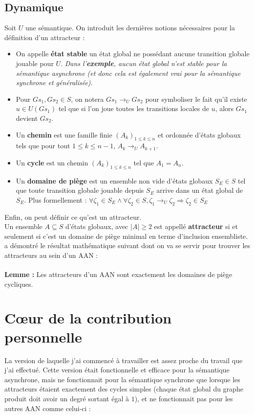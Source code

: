 \documentclass[12pt,a4paper]{article}
\begin{document}
\subsection{Dynamique}
Soit $U$ une sémantique. On introduit les dernières notions nécessaires pour la définition d'un attracteur :
\begin{itemize}
	\item On appelle \textbf{état stable} un état global ne possédant aucune transition globale jouable pour $U$.
	\emph{Dans l'\textbf{exemple}, aucun état global n'est stable pour la sémantique asynchrone (et donc cela est également vrai pour la sémantique synchrone et généralisée).}
	\item Pour $Gs_1,Gs_2\in S$, on notera $Gs_1\rightarrow _UGs_2$ pour symboliser le fait qu'il existe $u\in U(Gs_1)$ tel que si l'on joue toutes les transitions locales de $u$, alors $Gs_1$ devient $Gs_2$.
	\item Un \textbf{chemin} est une famille finie $(A_k)_{1\leq k\leq n}$ et ordonnée d'états globaux tels que pour tout $1\leq k\leq n-1$, $A_k\rightarrow _U A_{k+1}$.
	\item Un \textbf{cycle} est un chemin $(A_k)_{1\leq k\leq n}$ tel que $A_1=A_n$.
	\item Un \textbf{domaine de piège} est un ensemble non vide d'états globaux $S_E\in S$ tel que toute transition globale jouable depuis $S_E$ arrive dans un état global de $S_E$. Plus formellement : 
	$\forall\zeta _1\in S_E \wedge\forall\zeta _2\in S, \zeta _1 \rightarrow _U\zeta _2 \Rightarrow\zeta _2\in S_E$
\end{itemize}
Enfin, on peut définir ce qu'est un attracteur.\\
Un ensemble $A\subseteq S$ d'états globaux, avec $|A|\geq2$ est appellé \textbf{attracteur} si et seulement si c'est un domaine de piège minimal en terme d'inclusion ensembliste.\\
\cite{chapitre} a démontré le résultat mathématique suivant dont on va se servir pour trouver les attracteurs au sein d'un AAN :\\ \\
\textbf{Lemme :} Les attracteurs d'un AAN sont exactement les domaines de piège cycliques.

\section{Cœur de la contribution personnelle}
\hypertarget{debutpartie4}{
La version de laquelle j'ai commencé à travailler est assez proche du travail que j'ai effectué. Cette version était fonctionnelle et efficace pour la sémantique asynchrone, mais ne fonctionnait pour la sémantique synchrone que 
lorsque les attracteurs étaient exactement des cycles simples (chaque état global du graphe produit doit avoir un degré sortant égal à $1$), et ne fonctionnait pas pour les autres AAN comme celui-ci :\\ \\ \\
}
\end{document}
